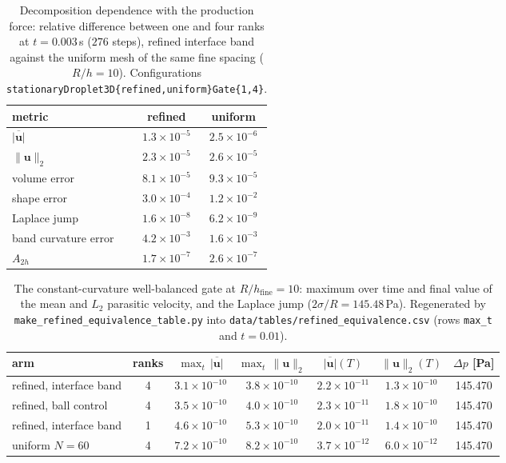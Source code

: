 \documentclass[preprint,3p,11pt]{elsarticle}
\begin{document}
\begin{table}[t]
  \centering
  \caption{Decomposition dependence with the production force: relative difference
  between one and four ranks at $t=0.003$\,s ($276$ steps), refined interface band
  against the uniform mesh of the same fine spacing ($R/h=10$). Configurations
  \texttt{stationaryDroplet3D\{refined,uniform\}Gate\{1,4\}}.}
  \label{tab:refined-decomp}
  \begin{tabular}{lcc}
    \hline
    metric & refined & uniform \\
    \hline
    $\overline{\lvert\mathbf u\rvert}$ & $1.3\times10^{-5}$ & $2.5\times10^{-6}$ \\
    $\lVert\mathbf u\rVert_2$ & $2.3\times10^{-5}$ & $2.6\times10^{-5}$ \\
    volume error & $8.1\times10^{-5}$ & $9.3\times10^{-5}$ \\
    shape error & $3.0\times10^{-4}$ & $1.2\times10^{-2}$ \\
    Laplace jump & $1.6\times10^{-8}$ & $6.2\times10^{-9}$ \\
    band curvature error & $4.2\times10^{-3}$ & $1.6\times10^{-3}$ \\
    $A_{2h}$ & $1.7\times10^{-7}$ & $2.6\times10^{-7}$ \\
    \hline
  \end{tabular}
\end{table}

\begin{table}[t]
  \centering
  \caption{The constant-curvature well-balanced gate at $R/h_{\mathrm{fine}}=10$: maximum
  over time and final value of the mean and $L_2$ parasitic velocity, and the Laplace
  jump ($2\sigma/R=145.48$\,Pa). Regenerated by
  \texttt{make\_refined\_equivalence\_table.py} into
  \texttt{data/tables/refined\_equivalence.csv} (rows \texttt{max\_t} and $t=0.01$).}
  \label{tab:refined-wb}
  \begin{tabular}{lcccccc}
    \hline
    arm & ranks & $\max_t\,\overline{\lvert\mathbf u\rvert}$ & $\max_t\,\lVert\mathbf u\rVert_2$ &
    $\overline{\lvert\mathbf u\rvert}(T)$ & $\lVert\mathbf u\rVert_2(T)$ & $\Delta p$ [Pa] \\
    \hline
    refined, interface band & 4 & $3.1\times10^{-10}$ & $3.8\times10^{-10}$ & $2.2\times10^{-11}$ & $1.3\times10^{-10}$ & 145.470 \\
    refined, ball control   & 4 & $3.5\times10^{-10}$ & $4.0\times10^{-10}$ & $2.3\times10^{-11}$ & $1.8\times10^{-10}$ & 145.470 \\
    refined, interface band & 1 & $4.6\times10^{-10}$ & $5.3\times10^{-10}$ & $2.0\times10^{-11}$ & $1.4\times10^{-10}$ & 145.470 \\
    uniform $N=60$          & 4 & $7.2\times10^{-10}$ & $8.2\times10^{-10}$ & $3.7\times10^{-12}$ & $6.0\times10^{-12}$ & 145.470 \\
    \hline
  \end{tabular}
\end{table}
\end{document}
